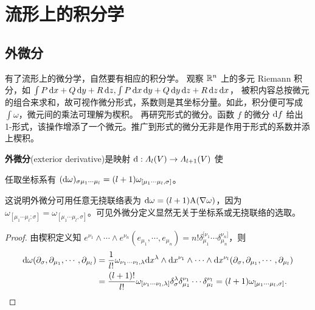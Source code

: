 \chapter{流形上的积分学}\label{appx:form}

\section{外微分}
有了流形上的微分学，自然要有相应的积分学。
观察 $\mathbb{R}^n$ 上的多元 Riemann 积分，如 $\int P\,\dd x+Q\,\dd y+R\,\dd z,\int P\,\dd x\,\dd y+Q\,\dd y\,\dd z+R\,\dd z\,\dd x$，
被积内容总按微元的组合来求和，故可视作微分形式，系数则是其坐标分量。如此，积分便可写成 $\int \omega$，微元间的乘法可理解为楔积。
再研究形式的微分。函数 $f$ 的微分 $\dd f$ 给出 1-形式，该操作增添了一个微元。推广到形式的微分无非是作用于形式的系数并添上楔积。
\begin{definition}
    \textbf{外微分}(exterior derivative)是映射 $\dd:\Lambda_l(V)\to\Lambda_{l+1}(V)$ 使
\end{definition}

\begin{theorem}
    任取坐标系有 $(\dd\omega)_{\sigma\mu_1\cdots\mu_l}=(l+1)\omega_{[\mu_1\cdots\mu_l,\sigma]}$。
\end{theorem}

\begin{remark}
    这说明外微分可用任意无挠联络表为 $\dd\omega=(l+1)\mathrm{A}(\nabla\omega)$，因为 $\omega_{[\mu_1\cdots\mu_l;\sigma]}=\omega_{[\mu_1\cdots\mu_l,\sigma]}$。可见外微分定义显然无关于坐标系或无挠联络的选取。
\end{remark}

\begin{proof}由楔积定义知 $e^{\nu_1}\wedge\cdots\wedge e^{\nu_n}(e_{\mu_1},\cdots,e_{\mu_n})=n!\delta_{\mu_1}^{[\nu_1}\cdots\delta_{\mu_n}^{\nu_n]}$，则
    \begin{align*}
        \dd\omega(\partial_{\sigma},\partial_{\mu_1},\cdots,\partial_{\mu_l})&=\frac{1}{l!}\omega_{\nu_1\cdots\nu_l,\lambda}\dd x^\lambda\wedge\dd x^{\nu_{1}}\wedge\cdots\wedge\dd x^{\nu_{l}}(\partial_{\sigma},\partial_{\mu_1},\cdots,\partial_{\mu_l})\\
        &=\frac{(l+1)!}{l!} \omega_{[\nu_1\cdots\nu_l,\lambda]} \delta_{\sigma}^{\lambda}\delta_{\mu_1}^{\nu_1}\cdots\delta_{\mu_l}^{\nu_l}=(l+1)\omega_{[\mu_1\cdots\mu_l,\sigma]}.\qedhere
    \end{align*}
\end{proof}

